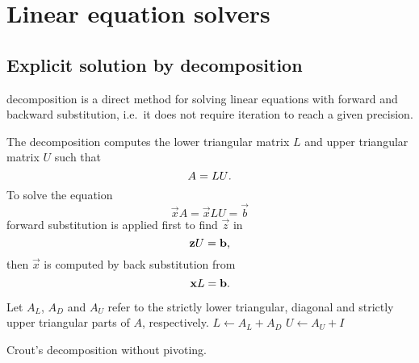 \section{Linear equation solvers}
\label{sec:algorithms:solvers}

\subsection{Explicit solution by  decomposition}
\label{ssec:algorithms:lu}

 decomposition is a direct method for solving linear
equations with forward and backward substitution, i.e.~it does not
require iteration to reach a given precision.

The decomposition computes the lower triangular matrix $L$ and upper
triangular matrix $U$ such that
\begin{equation}
  A = LU \text.
\end{equation}
To solve the equation
\begin{equation}
  \vec{x} A = \vec{x} LU = \vec{b}
\end{equation}
forward substitution is applied first to find $\vec{z}$ in
\begin{equation}
  \vec{z} U = \vec{b}\text,
\end{equation}
then $\vec{x}$ is computed by back substitution from
\begin{equation}
  \vec{x} L = \vec{b}\text.
\end{equation}

\begin{algorithm}
  Let $A_L$, $A_D$ and $A_U$ refer to the strictly lower triangular,
  diagonal and strictly upper triangular parts of $A$, respectively.\;
  $L \gets A_L + A_D$\;
  $U \gets A_U + I$\;
  \;
  \caption{Crout's  decomposition without pivoting.}
  \label{alg:algorithms:lu:crout}
\end{algorithm}

